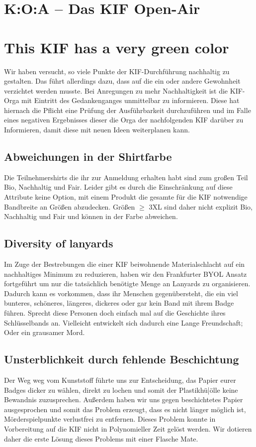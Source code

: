 \section*{K:O:A -- Das KIF Open-Air}



\section*{This KIF has a very green color}
Wir haben versucht, so viele Punkte der KIF-Durchführung nachhaltig zu gestalten. Das führt
allerdings dazu, dass auf die ein oder andere Gewohnheit verzichtet werden musste. Bei Anregungen
zu mehr Nachhaltigkeit ist die KIF-Orga mit Eintritt des Gedankenganges unmittelbar zu informieren.
Diese hat hiernach die Pflicht eine Prüfung der Ausführbarkeit durchzuführen und im Falle eines
negativen Ergebnisses dieser die Orga der nachfolgenden KIF darüber zu Informieren, damit diese mit
neuen Ideen weiterplanen kann.

\subsection*{Abweichungen in der Shirtfarbe}
Die Teilnehmershirts die ihr zur Anmeldung erhalten habt sind zum großen Teil Bio, Nachhaltig und
Fair. Leider gibt es durch die Einschränkung auf diese Attribute keine Option, mit einem Produkt die
gesamte für die KIF notwendige Bandbreite an Größen abzudecken. Größen $\geq$ 3XL sind daher nicht
explizit Bio, Nachhaltig und Fair und können in der Farbe abweichen.

\subsection*{Diversity of lanyards}
Im Zuge der Bestrebungen die einer KIF beiwohnende Materialschlacht auf ein nachhaltiges Minimum zu
reduzieren, haben wir den Frankfurter BYOL Ansatz fortgeführt um nur die tatsächlich benötigte Menge
an Lanyards zu organisieren. Dadurch kann es vorkommen, dass ihr Menschen gegenübersteht, die ein
viel bunteres, schöneres, längeres, dickeres oder gar kein Band mit ihrem Badge führen. Sprecht
diese Personen doch einfach mal auf die Geschichte ihres Schlüsselbands an. Vielleicht entwickelt
sich dadurch eine Lange Freundschaft; Oder ein grausamer Mord.

\subsection*{Unsterblichkeit durch fehlende Beschichtung}
Der Weg weg vom Kunststoff führte uns zur Entscheidung, das Papier eurer Badges dicker zu wählen,
direkt zu lochen und somit der Plastikh{ü|ö}lle keine Bewandnis zuzusprechen. Außerdem haben wir uns
gegen beschichtetes Papier ausgesprochen und somit das Problem erzeugt, dass es nicht länger möglich
ist, Mörderspielpunkte verlustfrei zu entfernen. Dieses Problem konnte in Vorbereitung auf die KIF
nicht in Polynomieller Zeit gelöst werden. Wir dotieren daher die erste Lösung dieses Problems mit
einer Flasche Mate.

